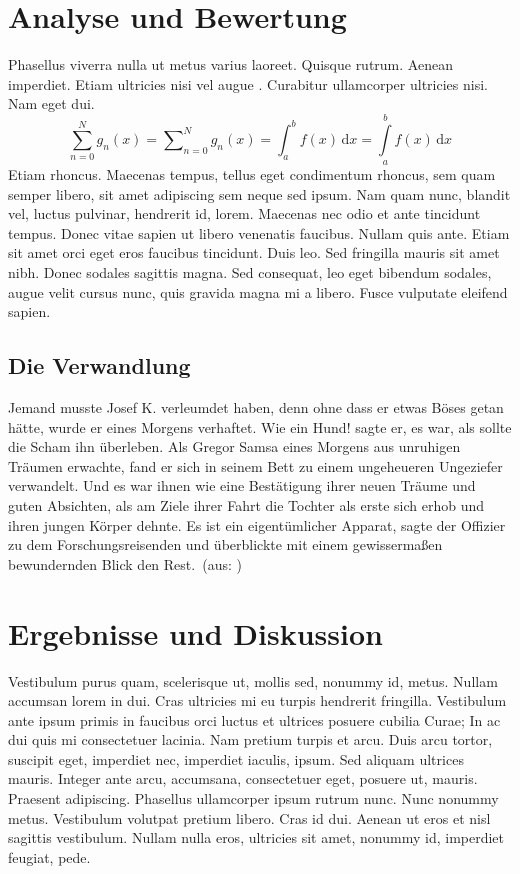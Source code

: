\documentclass[paper=a4,fontsize=12pt,ngerman]{scrartcl}
\begin{document}
\section{Analyse und Bewertung}
Phasellus viverra nulla ut metus varius laoreet. Quisque rutrum. Aenean 
imperdiet. Etiam ultricies nisi vel augue \cite{ab94}. Curabitur ullamcorper 
ultricies nisi. Nam eget dui. 
\begin{equation}
  \sum_{n=0}^N g_n(x) = \sum\nolimits_{n=0}^N g_n(x) =
  \int_a^b f(x) \,\mbox{d}x = \int\limits_a^b f(x) \,\mbox{d}x 
\end{equation}
Etiam rhoncus. Maecenas tempus, tellus eget condimentum rhoncus, sem quam 
semper libero, sit amet adipiscing sem neque sed ipsum. Nam quam nunc, 
blandit vel, luctus pulvinar, hendrerit id, lorem. Maecenas nec odio et ante 
\cite{ah2006} tincidunt tempus. Donec vitae sapien ut libero venenatis 
faucibus. Nullam quis ante. Etiam sit amet orci eget eros faucibus tincidunt. 
Duis leo. Sed fringilla mauris sit amet nibh. Donec sodales sagittis magna. 
Sed consequat, leo eget bibendum sodales, augue velit cursus nunc, quis 
gravida magna mi a libero. Fusce vulputate eleifend sapien.

\subsection{Die Verwandlung}
\glqq Jemand musste Josef K. verleumdet haben, denn ohne dass er etwas Böses 
getan hätte, wurde er eines Morgens verhaftet. Wie ein Hund! sagte er, es 
war, als sollte die Scham ihn überleben. Als Gregor Samsa eines Morgens aus 
unruhigen Träumen erwachte, fand er sich in seinem Bett zu einem ungeheueren 
Ungeziefer verwandelt. Und es war ihnen wie eine Bestätigung ihrer neuen 
Träume und guten Absichten, als am Ziele ihrer Fahrt die Tochter als erste 
sich erhob und ihren jungen Körper dehnte. Es ist ein eigentümlicher Apparat, 
sagte der Offizier zu dem Forschungsreisenden und überblickte mit einem 
gewissermaßen bewundernden Blick den Rest.\grqq \ (aus: \cite{kaf12})

\section{Ergebnisse und Diskussion}
Vestibulum purus quam, scelerisque ut, mollis sed, nonummy id, metus. Nullam 
accumsan lorem in dui. Cras ultricies mi eu turpis hendrerit fringilla. 
Vestibulum ante ipsum primis in faucibus orci luctus et ultrices posuere 
cubilia Curae; In ac dui quis mi consectetuer lacinia. Nam pretium turpis et 
arcu. Duis arcu tortor, suscipit eget, imperdiet nec, imperdiet iaculis, 
ipsum. Sed aliquam ultrices mauris. Integer \cite{m85} ante arcu, accumsana, 
consectetuer eget, posuere ut, mauris. Praesent adipiscing. Phasellus 
ullamcorper ipsum rutrum nunc. Nunc nonummy metus. Vestibulum volutpat 
pretium libero. Cras id dui. Aenean ut eros et nisl sagittis vestibulum. 
Nullam nulla eros, ultricies sit amet, nonummy id, imperdiet feugiat, pede.
\end{document}
